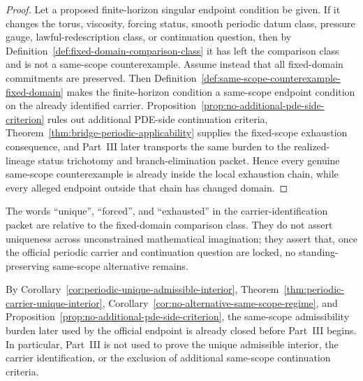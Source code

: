\begin{proof}
Let a proposed finite-horizon singular endpoint condition be given. If it changes the torus, viscosity, forcing status, smooth periodic datum class, pressure gauge, lawful-redescription class, or continuation question, then by Definition~\ref{def:fixed-domain-comparison-class} it has left the comparison class and is not a same-scope counterexample. Assume instead that all fixed-domain commitments are preserved. Then Definition~\ref{def:same-scope-counterexample-fixed-domain} makes the finite-horizon condition a same-scope endpoint condition on the already identified carrier. Proposition~\ref{prop:no-additional-pde-side-criterion} rules out additional PDE-side continuation criteria, Theorem~\ref{thm:bridge-periodic-applicability} supplies the fixed-scope exhaustion consequence, and Part~III later transports the same burden to the realized-lineage status trichotomy and branch-elimination packet. Hence every genuine same-scope counterexample is already inside the local exhaustion chain, while every alleged endpoint outside that chain has changed domain.
\end{proof}

\begin{remark}\label{rem:relative-uniqueness-locked-scope}
The words ``unique'', ``forced'', and ``exhausted'' in the carrier-identification packet are relative to the fixed-domain comparison class. They do not assert uniqueness across unconstrained mathematical imagination; they assert that, once the official periodic carrier and continuation question are locked, no standing-preserving same-scope alternative remains.
\end{remark}

\begin{manualcorollary}
\label{cor:no-circular-burden-after-carrier-packet}
By Corollary~\ref{cor:periodic-unique-admissible-interior}, Theorem~\ref{thm:periodic-carrier-unique-interior}, Corollary~\ref{cor:no-alternative-same-scope-regime}, and Proposition~\ref{prop:no-additional-pde-side-criterion}, the same-scope admissibility burden later used by the official endpoint is already closed before Part~III begins. In particular, Part~III is not used to prove the unique admissible interior, the carrier identification, or the exclusion of additional same-scope continuation criteria.
\end{manualcorollary}

